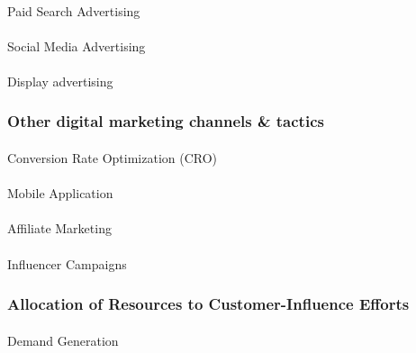 \documentclass[
  12pt,
  letterpaper,
  DIV=11,
  numbers=noendperiod]{scrartcl}
\makeatletter
\let\oldparagraph\paragraph
\renewcommand{\paragraph}{
    \@ifstar
      \xxxParagraphStar
      \xxxParagraphNoStar
  }
\newcommand{\xxxParagraphStar}[1]{\oldparagraph*{#1}\mbox{}}
\newcommand{\xxxParagraphNoStar}[1]{\oldparagraph{#1}\mbox{}}
\makeatother
\begin{document}
\paragraph{Paid Search Advertising}\label{paid-search-advertising}

\paragraph{Social Media Advertising}\label{social-media-advertising}

\paragraph{Display advertising}\label{display-advertising}

\subsubsection{Other digital marketing channels \&
tactics}\label{other-digital-marketing-channels-tactics}

\paragraph{Conversion Rate Optimization
(CRO)}\label{conversion-rate-optimization-cro}

\paragraph{Mobile Application}\label{mobile-application}

\paragraph{Affiliate Marketing}\label{affiliate-marketing}

\paragraph{Influencer Campaigns}\label{influencer-campaigns}

\subsubsection{Allocation of Resources to Customer-Influence
Efforts}\label{allocation-of-resources-to-customer-influence-efforts}

\paragraph{Demand Generation}\label{demand-generation}
\end{document}
